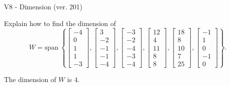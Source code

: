 \begin{exercise}
  \begin{exerciseTitle}V8 - Dimension (ver. 201)\end{exerciseTitle}
  \begin{exerciseStatement}
    Explain how to find the dimension of 
\[W=\mathrm{span}\ \left\{\left[\begin{array}{r}
-4 \\
0 \\
1 \\
1 \\
-3
\end{array}\right] , \left[\begin{array}{r}
3 \\
-2 \\
-1 \\
-1 \\
-4
\end{array}\right] , \left[\begin{array}{r}
-3 \\
-2 \\
-4 \\
-3 \\
-4
\end{array}\right] , \left[\begin{array}{r}
12 \\
4 \\
11 \\
8 \\
8
\end{array}\right] , \left[\begin{array}{r}
18 \\
8 \\
10 \\
7 \\
25
\end{array}\right] , \left[\begin{array}{r}
-1 \\
1 \\
0 \\
-1 \\
0
\end{array}\right]\right\}.\]



  \end{exerciseStatement}
  \begin{exerciseAnswer}
   The dimension of \(W\) is  \(4\).
  


  \end{exerciseAnswer}
\end{exercise}